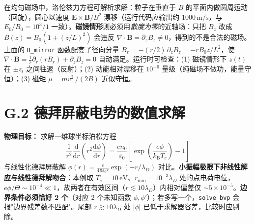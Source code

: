 \documentclass[12pt,a4paper,openany,oneside]{book}
\newcommand{\diff}{\mathrm{d}}
\newcommand{\eps}{\varepsilon}
\newcommand{\vect}[1]{\bm{#1}}
\newcommand{\divg}{\nabla\cdot}
\begin{document}
\begin{insight}{}{}
在均匀磁场中，洛伦兹力方程可解析求解：粒子在垂直于 $B$ 的平面内做圆周运动（回旋），圆心以速度 $\vect{E}\times\vect{B}/B^2$ 漂移（运行代码应输出约 $1000\,\mathrm{m/s}$，与 $E_0/B_0=10^3/1$ 一致）。\textbf{磁镜情形}则必须用\emph{散度为零}的近轴场：只把 $B_z$ 改成 $B(z)=B_0(1+(z/L)^2)$ 会违反 $\divg\vect{B}=\partial_zB_z\ne0$，得到的不是合法的磁场。上面的 \texttt{B\_mirror} 函数配套了径向分量 $B_r = -(r/2)\,\partial_zB_z = -rB_0z/L^2$，使 $\divg\vect{B}=\frac1r\partial_r(rB_r)+\partial_zB_z=0$ 自动满足。运行时可检查：(1) 磁镜情形下 $z(t)$ 在 $\pm z_t$ 之间往返（反射）；(2) 动能相对漂移在 $10^{-6}$ 量级（纯磁场不做功，能量守恒）；(3) 磁矩 $\mu=mv_\perp^2/(2B)$ 近似守恒。
\end{insight}


\section{G.2 德拜屏蔽电势的数值求解}

\textbf{物理目标：} 求解一维球坐标泊松方程
\begin{equation}
\frac{1}{r^2}\frac{\diff}{\diff r}\left(r^2\frac{\diff\phi}{\diff r}\right) = \frac{e n_0}{\eps_0}\left[\exp\!\left(\frac{e\phi}{k_\mathrm{B}T_e}\right)-1\right]
\label{eq:app-debye-radial}
\end{equation}
与线性化德拜屏蔽解 $\phi(r)=\frac{e}{4\pi\eps_0 r}\exp(-r/\lambda_D)$ 对比。\textbf{小振幅极限下非线性解应与线性德拜解吻合}：本例取 $T_e=10\,\mathrm{eV}$、$r_{\min}=10^{-3}\lambda_D$ 处的点电荷电位，$e\phi/\Theta\sim10^{-4}\ll1$，故两者在有效区间（$r\lesssim10\lambda_D$）内相对偏差仅 $\sim5\times10^{-5}$。\textbf{边界条件必须恰好 2 个}（对应 2 个未知函数 $\phi,\phi'$）；若多写一个，\texttt{solve\_bvp} 会报"边界残差数不匹配"。尾部 $r\gtrsim10\lambda_D$ 处 $|\phi|$ 已低于求解器容差，比较时应剔除。
\end{document}
